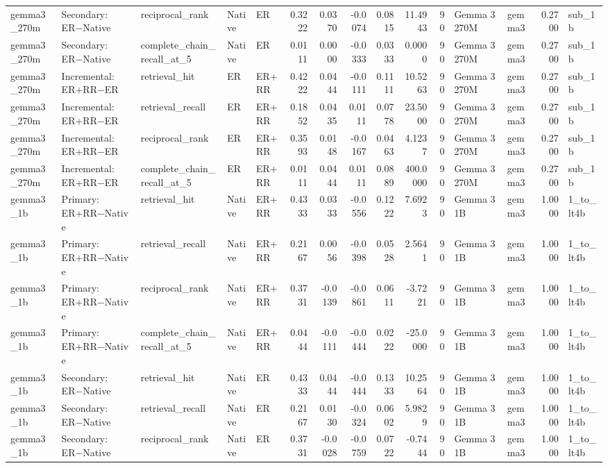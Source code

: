 \begin{tabular}{lllllrrrrrrllrl}
gemma3_270m & Secondary: ER−Native & reciprocal_rank & Native & ER & 0.3222 & 0.0370 & -0.0074 & 0.0815 & 11.4943 & 90 & Gemma 3 270M & gemma3 & 0.2700 & sub_1b \\
gemma3_270m & Secondary: ER−Native & complete_chain_recall_at_5 & Native & ER & 0.0111 & 0.0000 & -0.0333 & 0.0333 & 0.0000 & 90 & Gemma 3 270M & gemma3 & 0.2700 & sub_1b \\
gemma3_270m & Incremental: ER+RR−ER & retrieval_hit & ER & ER+RR & 0.4222 & 0.0444 & -0.0111 & 0.1111 & 10.5263 & 90 & Gemma 3 270M & gemma3 & 0.2700 & sub_1b \\
gemma3_270m & Incremental: ER+RR−ER & retrieval_recall & ER & ER+RR & 0.1852 & 0.0435 & 0.0111 & 0.0778 & 23.5000 & 90 & Gemma 3 270M & gemma3 & 0.2700 & sub_1b \\
gemma3_270m & Incremental: ER+RR−ER & reciprocal_rank & ER & ER+RR & 0.3593 & 0.0148 & -0.0167 & 0.0463 & 4.1237 & 90 & Gemma 3 270M & gemma3 & 0.2700 & sub_1b \\
gemma3_270m & Incremental: ER+RR−ER & complete_chain_recall_at_5 & ER & ER+RR & 0.0111 & 0.0444 & 0.0111 & 0.0889 & 400.0000 & 90 & Gemma 3 270M & gemma3 & 0.2700 & sub_1b \\
gemma3_1b & Primary: ER+RR−Native & retrieval_hit & Native & ER+RR & 0.4333 & 0.0333 & -0.0556 & 0.1222 & 7.6923 & 90 & Gemma 3 1B & gemma3 & 1.0000 & 1_to_lt4b \\
gemma3_1b & Primary: ER+RR−Native & retrieval_recall & Native & ER+RR & 0.2167 & 0.0056 & -0.0398 & 0.0528 & 2.5641 & 90 & Gemma 3 1B & gemma3 & 1.0000 & 1_to_lt4b \\
gemma3_1b & Primary: ER+RR−Native & reciprocal_rank & Native & ER+RR & 0.3731 & -0.0139 & -0.0861 & 0.0611 & -3.7221 & 90 & Gemma 3 1B & gemma3 & 1.0000 & 1_to_lt4b \\
gemma3_1b & Primary: ER+RR−Native & complete_chain_recall_at_5 & Native & ER+RR & 0.0444 & -0.0111 & -0.0444 & 0.0222 & -25.0000 & 90 & Gemma 3 1B & gemma3 & 1.0000 & 1_to_lt4b \\
gemma3_1b & Secondary: ER−Native & retrieval_hit & Native & ER & 0.4333 & 0.0444 & -0.0444 & 0.1333 & 10.2564 & 90 & Gemma 3 1B & gemma3 & 1.0000 & 1_to_lt4b \\
gemma3_1b & Secondary: ER−Native & retrieval_recall & Native & ER & 0.2167 & 0.0130 & -0.0324 & 0.0602 & 5.9829 & 90 & Gemma 3 1B & gemma3 & 1.0000 & 1_to_lt4b \\
gemma3_1b & Secondary: ER−Native & reciprocal_rank & Native & ER & 0.3731 & -0.0028 & -0.0759 & 0.0722 & -0.7444 & 90 & Gemma 3 1B & gemma3 & 1.0000 & 1_to_lt4b \\

\end{tabular}

